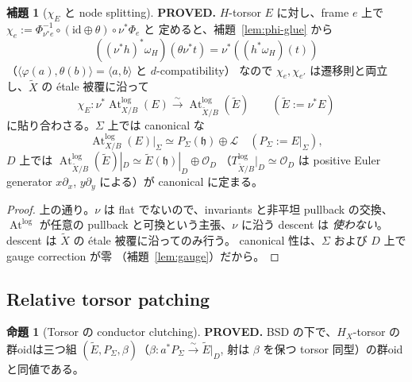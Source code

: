 \documentclass[11pt,a4paper]{article}
\numberwithin{equation}{section}
\theoremstyle{definition}
\newtheorem{lemma}[definition]{補題}
\newtheorem{proposition}[definition]{命題}
\newcommand{\OO}{\mathcal O}
\newcommand{\h}{\mathfrak h}
\newcommand{\Atlog}{\operatorname{At}^{\log}}
\newcommand{\tX}{\widetilde X}
\newcommand{\tE}{\widetilde E}
\newcommand{\LL}{\mathcal L}
\begin{document}
\begin{lemma}[$\chi_E$ と node splitting]\label{lem:chi}
\textbf{PROVED.} $H$-torsor $E$ に対し、frame $e$ 上で
\(\chi_e:=\Phi_{\nu^*e}^{-1}\circ(\mathrm{id}\oplus\theta)\circ\nu^*\Phi_e\) と
定めると、補題~\ref{lem:phi-glue} から
\[
  ((\nu^*h)^*\omega_H)(\theta\nu^*t)=\nu^*((h^*\omega_H)(t))
  \tag{3.1}\label{eq:F4}
\]
（$\langle\varphi(a),\theta(b)\rangle=\langle a,b\rangle$ と $d$-compatibility）
なので $\chi_e,\chi_{e'}$ は遷移則と両立し、$\tX$ の étale 被覆に沿って
\[
  \chi_E:\nu^*\Atlog_{X/B}(E)\xrightarrow{\sim}\Atlog_{\tX/B}(\tE)
  \qquad(\tE:=\nu^*E)
\]
に貼り合わさる。$\Sigma$ 上では canonical な
\begin{equation}\label{eq:F6}
  \Atlog_{X/B}(E)|_\Sigma\simeq P_\Sigma(\h)\oplus\LL\quad(P_\Sigma:=E|_\Sigma),
\end{equation}
$D$ 上では $\Atlog_{\tX/B}(\tE)|_D\simeq\tE(\h)|_D\oplus\OO_D$
（$T^{\log}_{\tX/B}|_D\simeq\OO_D$ は positive Euler generator $x\partial_x$,
$y\partial_y$ による）が canonical に定まる。
\end{lemma}

\begin{proof}
上の通り。\(\nu\) は flat でないので、invariants と非平坦 pullback の交換、
$\Atlog$ が任意の pullback と可換という主張、$\nu$ に沿う descent は
\emph{使わない}。descent は $\tX$ の étale 被覆に沿ってのみ行う。
canonical 性は、$\Sigma$ および $D$ 上で gauge correction が零
（補題~\ref{lem:gauge}）だから。
\end{proof}

\subsection{Relative torsor patching}

\begin{proposition}[Torsor の conductor clutching]\label{prop:torsor-patch}
\textbf{PROVED.} BSD の下で、$H_X$-torsor の群oidは三つ組
$(\tE,P_\Sigma,\beta)$（$\beta:a^*P_\Sigma\xrightarrow{\sim}\tE|_D$,
射は $\beta$ を保つ torsor 同型）の群oidと同値である。
\end{proposition}
\end{document}
